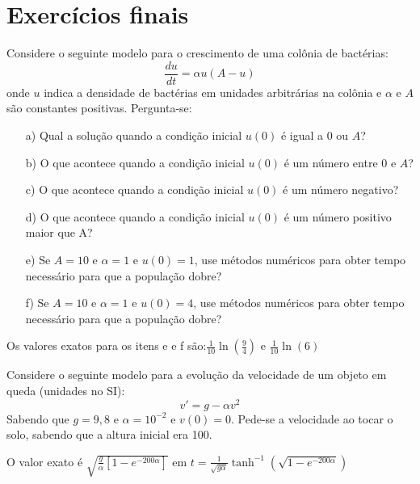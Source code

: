 \section{Exercícios finais}

\begin{exer} Considere o seguinte modelo para o crescimento de uma colônia de bactérias:
$$\frac{du}{dt}=\alpha u (A-u)$$
onde $u$ indica a densidade de bactérias em unidades arbitrárias na colônia e $\alpha$ e $A$ são constantes positivas.
Pergunta-se:
\begin{itemize}
\item[a)] Qual a solução quando a condição inicial $u(0)$ é igual a $0$ ou $A$?
\item[b)] O que acontece quando a condição inicial $u(0)$ é um número entre $0$ e $A$?
\item[c)] O que acontece quando a condição inicial $u(0)$ é um número negativo?
\item[d)] O que acontece quando a condição inicial $u(0)$ é um número positivo maior que A?
\item[e)] Se $A=10$ e $\alpha=1$ e $u(0)=1$, use métodos numéricos para obter tempo necessário para que a população dobre?
\item[f)] Se $A=10$ e $\alpha=1$ e $u(0)=4$, use métodos numéricos para obter tempo necessário para que a população dobre?
\end{itemize}
\end{exer}
\begin{resp}

Os valores exatos para os itens e e f são:$\frac{1}{10}\ln\left(\frac{9}{4}\right)$ e $\frac{1}{10}\ln\left(6\right)$

\end{resp}

\begin{exer} Considere o seguinte modelo para a evolução da velocidade de um objeto em queda (unidades no SI):
$$v'=g-\alpha v^2$$
Sabendo que $g=9,8$ e $\alpha=10^{-2}$ e $v(0)=0$. Pede-se a velocidade ao tocar o solo, sabendo que a altura inicial era 100.

\end{exer}
\begin{resp}

O valor exato é $\sqrt{\frac{g}{\alpha}\left[1-e^{{-200\alpha}}\right]}$ em $t=\frac{1}{\sqrt{g\alpha}}\tanh^{-1}\left(\sqrt{1-e^{{-200\alpha}}}\right)$

\end{resp}


